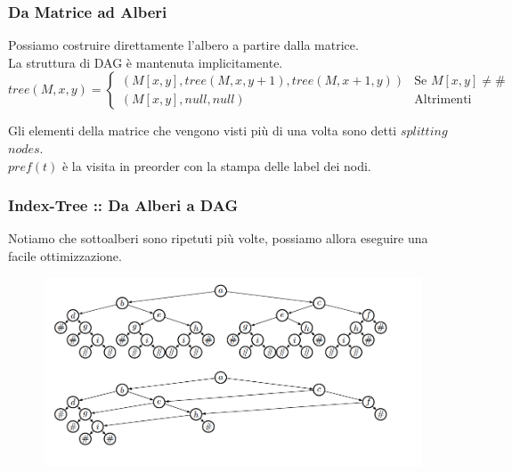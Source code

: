 \documentclass{beamer}
\begin{document}
\begin{frame}
\frametitle{Da Matrice ad Alberi}
Possiamo costruire direttamente l'albero a partire dalla matrice.\\
La struttura di DAG è mantenuta implicitamente.\\
\fontsize{10pt}{7.2}\selectfont
\[
	tree(M,x,y) = \begin{cases}
		(M[x,y], tree(M,x,y+1) , tree(M,x+1,y) ) & \text{Se $M[x,y] \not = \#$ }\\
		(M[x,y], null, null) & \text{Altrimenti}
	\end{cases}
\]
\fontsize{12pt}{7.2}\selectfont
\begin{definition}
Gli elementi della matrice che vengono visti più di una volta sono detti $splitting$ $nodes$.\\
$pref(t)$ è la visita in preorder con la stampa delle label dei nodi.
\end{definition}

\end{frame}

\begin{frame}
\frametitle{Index-Tree :: Da Alberi a DAG}
Notiamo che sottoalberi sono ripetuti più volte, possiamo allora eseguire una facile ottimizzazione.
\begin{figure}[p]
    \includegraphics[width=1\textwidth]{index.png}
\end{figure}
\end{frame}
\end{document}
